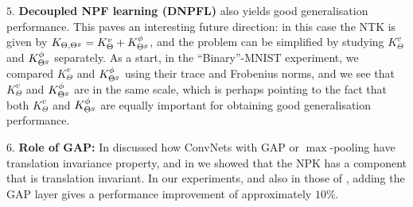 $5.$ \textbf{Decoupled NPF learning (DNPFL)} also yields good generalisation performance. This paves an interesting future direction:  in this case the NTK is given by $K_{\Theta,{\Theta}^g}=K^v_{\Theta}+K^{\phi}_{{\Theta}^g}$, and the problem can be simplified by studying $K^v_{\Theta}$ and $K^{\phi}_{{\Theta}^g}$ separately. As a start, in the ``Binary''-MNIST experiment, we compared $K^v_{\Theta}$ and $K^{\phi}_{{\Theta}^g}$ using their trace and Frobenius norms, and we see that $K^v_{\Theta}$ and $K^{\phi}_{{\Theta}^g}$ are in the same scale, which is perhaps pointing to the fact that both $K^v_{\Theta}$ and $K^{\phi}_{{\Theta}^g}$ are equally important for obtaining good generalisation performance. 

$6.$ \textbf{Role of GAP:} In  discussed how ConvNets with GAP or $\max$-pooling have translation invariance property, and in  we showed that the NPK has a component that is translation invariant. In our experiments, and also in those of \cite{arora2019}, adding the GAP layer gives a performance improvement of approximately $10\%$.

